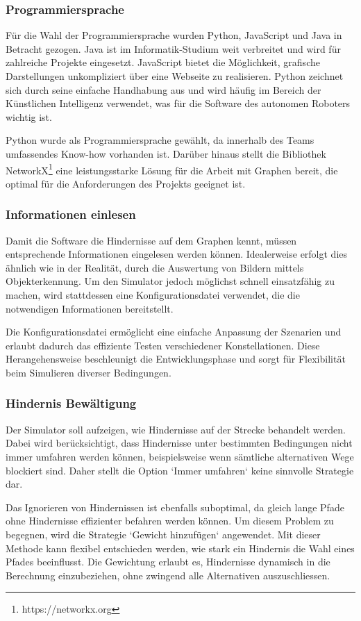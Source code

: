 \documentclass[../main.tex]{subfiles}
\begin{document}
\subsubsection{Programmiersprache}

Für die Wahl der Programmiersprache wurden Python, JavaScript und Java in Betracht gezogen. Java ist im Informatik-Studium weit verbreitet und wird für zahlreiche Projekte eingesetzt. JavaScript bietet die Möglichkeit, grafische Darstellungen unkompliziert über eine Webseite zu realisieren. Python zeichnet sich durch seine einfache Handhabung aus und wird häufig im Bereich der Künstlichen Intelligenz verwendet, was für die Software des autonomen Roboters wichtig ist.

Python wurde als Programmiersprache gewählt, da innerhalb des Teams umfassendes Know-how vorhanden ist. Darüber hinaus stellt die Bibliothek NetworkX\footnote{https://networkx.org} eine leistungsstarke Lösung für die Arbeit mit Graphen bereit, die optimal für die Anforderungen des Projekts geeignet ist.

\subsubsection{Informationen einlesen}

Damit die Software die Hindernisse auf dem Graphen kennt, müssen entsprechende Informationen eingelesen werden können. Idealerweise erfolgt dies ähnlich wie in der Realität, durch die Auswertung von Bildern mittels Objekterkennung. Um den Simulator jedoch möglichst schnell einsatzfähig zu machen, wird stattdessen eine Konfigurationsdatei verwendet, die die notwendigen Informationen bereitstellt.

Die Konfigurationsdatei ermöglicht eine einfache Anpassung der Szenarien und erlaubt dadurch das effiziente Testen verschiedener Konstellationen. Diese Herangehensweise beschleunigt die Entwicklungsphase und sorgt für Flexibilität beim Simulieren diverser Bedingungen.

\subsubsection{Hindernis Bewältigung}

Der Simulator soll aufzeigen, wie Hindernisse auf der Strecke behandelt werden.
Dabei wird berücksichtigt, dass Hindernisse unter bestimmten Bedingungen nicht immer umfahren werden können, beispielsweise wenn sämtliche alternativen Wege blockiert sind. Daher stellt die Option `Immer umfahren` keine sinnvolle Strategie dar.

Das Ignorieren von Hindernissen ist ebenfalls suboptimal, da gleich lange Pfade ohne Hindernisse effizienter befahren werden können. Um diesem Problem zu begegnen, wird die Strategie `Gewicht hinzufügen` angewendet. Mit dieser Methode kann flexibel entschieden werden, wie stark ein Hindernis die Wahl eines Pfades beeinflusst. Die Gewichtung erlaubt es, Hindernisse dynamisch in die Berechnung einzubeziehen, ohne zwingend alle Alternativen auszuschliessen.
\end{document}
